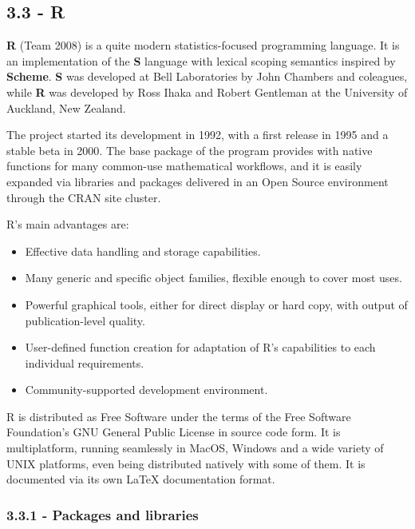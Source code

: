 \documentclass[]{article}
\begin{document}
\subsection{3.3 - R}\label{r}

\textbf{R} (Team 2008) is a quite modern statistics-focused programming
language. It is an implementation of the \textbf{S} language with
lexical scoping semantics inspired by \textbf{Scheme}. \textbf{S} was
developed at Bell Laboratories by John Chambers and coleagues, while
\textbf{R} was developed by Ross Ihaka and Robert Gentleman at the
University of Auckland, New Zealand.

The project started its development in 1992, with a first release in
1995 and a stable beta in 2000. The base package of the program provides
with native functions for many common-use mathematical workflows, and it
is easily expanded via libraries and packages delivered in an Open
Source environment through the CRAN site cluster.

R's main advantages are:

\begin{itemize}
\itemsep1pt\parskip0pt
\item
  Effective data handling and storage capabilities.\\
\item
  Many generic and specific object families, flexible enough to cover
  most uses.\\
\item
  Powerful graphical tools, either for direct display or hard copy, with
  output of publication-level quality.\\
\item
  User-defined function creation for adaptation of R's capabilities to
  each individual requirements.\\
\item
  Community-supported development environment.
\end{itemize}

R is distributed as Free Software under the terms of the Free Software
Foundation's GNU General Public License in source code form. It is
multiplatform, running seamlessly in MacOS, Windows and a wide variety
of UNIX platforms, even being distributed natively with some of them. It
is documented via its own LaTeX documentation format.

\subsubsection{3.3.1 - Packages and
libraries}\label{packages-and-libraries}
\end{document}
